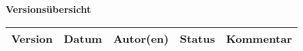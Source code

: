 

{\textbf{Versionsübersicht}}\\[2ex]

\begin{longtable}{|m{1.78cm}|m{1.59cm}|m{2.86cm}|m{1.9cm}|m{5.25cm}|}

  \hline                                              %

  \textbf{Version}  &    \textbf{Datum}  &    \textbf{Autor(en)}  &
  \textbf{Status}   &    \textbf{Kommentar}  \\  %
  \hline                                              %


\end{longtable}
